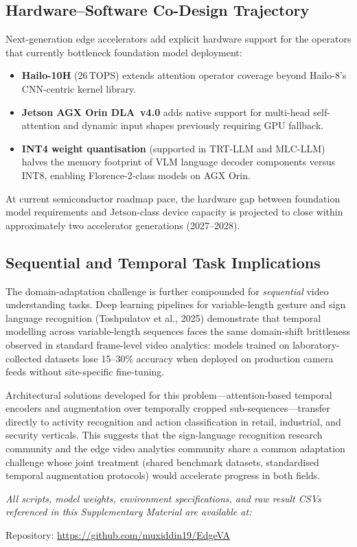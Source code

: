 \documentclass[11pt,a4paper]{article}
\begin{document}
\subsection{Hardware--Software Co-Design Trajectory}

Next-generation edge accelerators add explicit hardware support
for the operators that currently bottleneck foundation model
deployment:

\begin{itemize}[leftmargin=*, noitemsep]
  \item \textbf{Hailo-10H} (26\,TOPS) extends attention operator
    coverage beyond Hailo-8's CNN-centric kernel library.
  \item \textbf{Jetson AGX Orin DLA~v4.0} adds native support for
    multi-head self-attention and dynamic input shapes previously
    requiring GPU fallback.
  \item \textbf{INT4 weight quantisation} (supported in TRT-LLM and
    MLC-LLM) halves the memory footprint of VLM language decoder
    components versus INT8, enabling Florence-2-class models
    on AGX Orin.
\end{itemize}

At current semiconductor roadmap pace, the hardware gap between
foundation model requirements and Jetson-class device capacity is
projected to close within approximately two accelerator generations
(2027--2028).

\subsection{Sequential and Temporal Task Implications}

The domain-adaptation challenge is further compounded for
\emph{sequential} video understanding tasks. Deep learning pipelines
for variable-length gesture and sign language recognition
(Toshpulatov et al., 2025) demonstrate that temporal modelling
across variable-length sequences faces the same domain-shift
brittleness observed in standard frame-level video analytics:
models trained on laboratory-collected datasets lose 15--30\%
accuracy when deployed on production camera feeds without
site-specific fine-tuning.

Architectural solutions developed for this problem---attention-based
temporal encoders and augmentation over temporally cropped
sub-sequences---transfer directly to activity recognition and
action classification in retail, industrial, and security verticals.
This suggests that the sign-language recognition research community
and the edge video analytics community share a common adaptation
challenge whose joint treatment (shared benchmark datasets,
standardised temporal augmentation protocols) would accelerate
progress in both fields.

\bigskip
\noindent\textit{All scripts, model weights, environment
specifications, and raw result CSVs referenced in this Supplementary
Material are available at:}
\medskip

\noindent Repository: \url{https://github.com/muxiddin19/EdgeVA}
\end{document}
